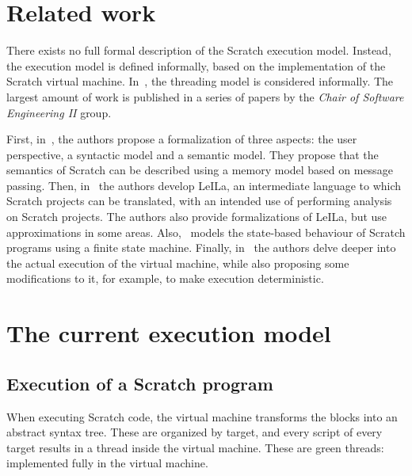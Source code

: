 \documentclass[../main]{subfiles}
\begin{document}
\section{Related work}\label{sec:execution-related-work}

There exists no full formal description of the Scratch execution model.
Instead, the execution model is defined informally, based on the implementation of the Scratch virtual machine.
In~\autocite{maloneyScratchProgrammingLanguage2010a}, the threading model is considered informally.
The largest amount of work is published in a series of papers by the \emph{Chair of Software Engineering II} group.

First, in~\autocite{stahlbauerTestingScratchPrograms2019}, the authors propose a formalization of three aspects: the user perspective, a syntactic model and a semantic model.
They propose that the semantics of Scratch can be described using a memory model based on message passing.
Then, in~\autocite{stahlbauerVerifiedScratchProgram2020} the authors develop LeILa, an intermediate language to which Scratch projects can be translated, with an intended use of performing analysis on Scratch projects.
The authors also provide formalizations of LeILa, but use approximations in some areas.
Also,~\autocite{gotzModelbasedTestingScratch2022} models the state-based behaviour of Scratch programs using a finite state machine.
Finally, in~\autocite{deinerAutomatedTestGeneration2023} the authors delve deeper into the actual execution of the virtual machine, while also proposing some modifications to it, for example, to make execution deterministic.

\section{The current execution model}\label{sec:the-current-execution-model}

\subsection{Execution of a Scratch program}\label{subsec:execution-of-a-scratch-program}

When executing Scratch code, the virtual machine transforms the blocks into an abstract syntax tree.
These are organized by target, and every script of every target results in a thread inside the virtual machine.
These are green threads: implemented fully in the virtual machine.
\end{document}
